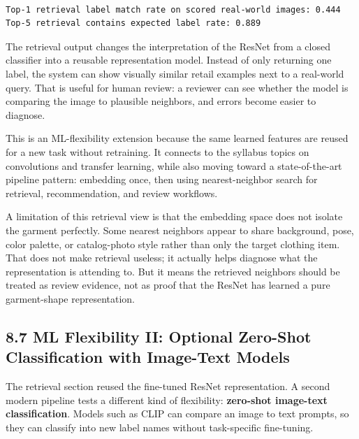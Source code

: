 \documentclass[11pt]{article}
\begin{document}
    \begin{center}
    \end{center}
    { \hspace*{\fill} \\}
    
    \begin{Verbatim}[commandchars=\\\{\}]
Top-1 retrieval label match rate on scored real-world images: 0.444
Top-5 retrieval contains expected label rate: 0.889
    \end{Verbatim}

    The retrieval output changes the interpretation of the ResNet from a
closed classifier into a reusable representation model. Instead of only
returning one label, the system can show visually similar retail
examples next to a real-world query. That is useful for human review: a
reviewer can see whether the model is comparing the image to plausible
neighbors, and errors become easier to diagnose.

This is an ML-flexibility extension because the same learned features
are reused for a new task without retraining. It connects to the
syllabus topics on convolutions and transfer learning, while also moving
toward a state-of-the-art pipeline pattern: embedding once, then using
nearest-neighbor search for retrieval, recommendation, and review
workflows.

A limitation of this retrieval view is that the embedding space does not
isolate the garment perfectly. Some nearest neighbors appear to share
background, pose, color palette, or catalog-photo style rather than only
the target clothing item. That does not make retrieval useless; it
actually helps diagnose what the representation is attending to. But it
means the retrieved neighbors should be treated as review evidence, not
as proof that the ResNet has learned a pure garment-shape
representation.

    \subsection{8.7 ML Flexibility II: Optional Zero-Shot Classification
with Image-Text
Models}\label{ml-flexibility-ii-optional-zero-shot-classification-with-image-text-models}

The retrieval section reused the fine-tuned ResNet representation. A
second modern pipeline tests a different kind of flexibility:
\textbf{zero-shot image-text classification}. Models such as CLIP can
compare an image to text prompts, so they can classify into new label
names without task-specific fine-tuning.
\end{document}
